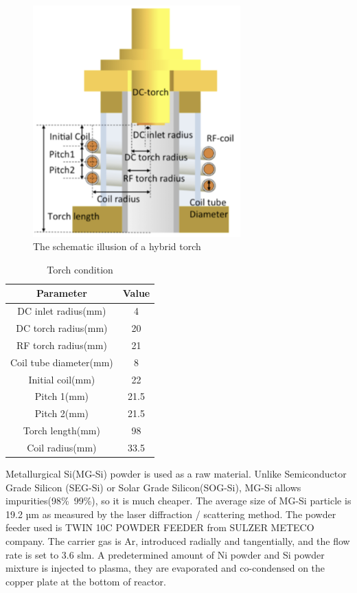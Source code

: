 \begin{figure}[h]
\centering
\includegraphics[width=8cm]{src/fig/fig21.png}
\caption{The schematic illusion of a hybrid torch}
\end{figure}

\begin{table}[htbp]
\centering
\caption{ Torch condition}
\begin{tabular}{cc}
\toprule
Parameter & Value\\
\midrule
DC inlet radius(mm) & 4 \\
DC torch radius(mm) & 20 \\
RF torch radius(mm) & 21 \\
Coil tube diameter(mm) & 8 \\
Initial coil(mm) & 22 \\
Pitch 1(mm) & 21.5 \\
Pitch 2(mm) & 21.5 \\
Torch length(mm) & 98 \\
Coil radius(mm) & 33.5 \\
\bottomrule
\end{tabular}
\end{table}

Metallurgical Si(MG-Si) powder is used as a raw material. Unlike Semiconductor Grade Silicon (SEG-Si) or Solar Grade Silicon(SOG-Si), MG-Si allows impurities(98\%~99\%), so it is much cheaper. The average size of MG-Si particle is 19.2 µm as measured by the laser diffraction / scattering method. The powder feeder used is TWIN 10C POWDER FEEDER from SULZER METECO company. The carrier gas is Ar, introduced radially and tangentially, and the flow rate is set to 3.6 slm. A predetermined amount of Ni powder and Si powder mixture is injected to plasma, they are evaporated and co-condensed on the copper plate at the bottom of reactor. 
